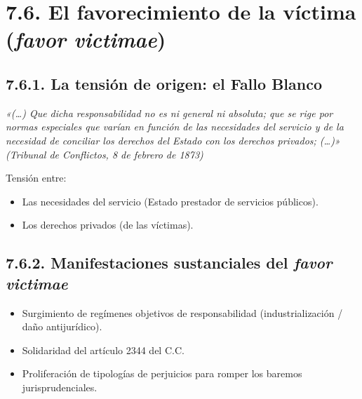 \section{7.6. El favorecimiento de la víctima (\textit{favor victimae})}
\subsection{7.6.1. La tensión de origen: el Fallo Blanco}
\begin{cita}
\textit{«(…) Que dicha responsabilidad no es ni general ni absoluta; que se rige por normas especiales que varían en función de las necesidades del servicio y de la necesidad de conciliar los derechos del Estado con los derechos privados; (…)» (Tribunal de Conflictos, 8 de febrero de 1873)}
\end{cita}
Tensión entre:

\begin{itemize}
\item Las necesidades del servicio (Estado prestador de servicios públicos).
\item Los derechos privados (de las víctimas).
\end{itemize}
\subsection{7.6.2. Manifestaciones sustanciales del \textit{favor victimae}}
\begin{itemize}
\item Surgimiento de regímenes objetivos de responsabilidad (industrialización / daño antijurídico).
\item Solidaridad del artículo 2344 del C.C.
\item Proliferación de tipologías de perjuicios para romper los baremos jurisprudenciales.
\end{itemize}
